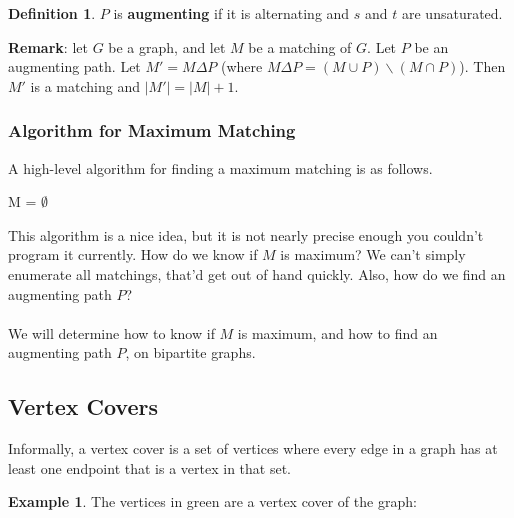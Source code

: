 \documentclass[]{article}
\theoremstyle{definition}
\newtheorem*{defn}{Definition}
\newtheorem{ex}{Example}[section]
\newcommand{\lecture}[1]{\marginpar{{\footnotesize $\leftarrow$ \underline{#1}}}}
\begin{document}
				\begin{defn}
					$P$ is \textbf{augmenting} if it is alternating and $s$ and $t$ are unsaturated.
				\end{defn}

				\textbf{Remark}: let $G$ be a graph, and let $M$ be a matching of $G$. Let $P$ be an augmenting path. Let $M' = M \Delta P$ (where $M \Delta P = (M \cup P) \backslash (M \cap P)$). Then $M'$ is a matching and $|M'| = |M| + 1$.

				\subsubsection{Algorithm for Maximum Matching} \lecture{April 1, 2013}
					A high-level algorithm for finding a maximum matching is as follows. \\
					\begin{algorithm}[H]
						M = $\emptyset$\;
					\end{algorithm}

					This algorithm is a nice idea, but it is not nearly precise enough \textendash{} you couldn't program it currently. How do we know if $M$ is maximum? We can't simply enumerate all matchings, that'd get out of hand quickly. Also, how do we find an augmenting path $P$?
					\\ \\
					We will determine how to know if $M$ is maximum, and how to find an augmenting path $P$, on bipartite graphs.

		\subsection{Vertex Covers}
			Informally, a vertex cover is a set of vertices where every edge in a graph has at least one endpoint that is a vertex in that set.
			\begin{ex}
				The vertices in green are a vertex cover of the graph:
				\begin{center}
				\end{center}
			\end{ex}
\end{document}
